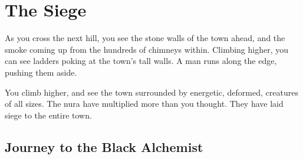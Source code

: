 \chapter{The Siege}

\begin{center}
\begin{tcolorbox}[width=35em]

	As you cross the next hill, you see the stone walls of the town ahead, and the smoke coming up from the hundreds of chimneys within.
	Climbing higher, you can see ladders poking at the town's tall walls.
	A man runs along the edge, pushing them aside.

	You climb higher, and see the town surrounded by energetic, deformed, creatures of all sizes.
	The nura have multiplied more than you thought.
	They have laid siege to the entire town.

\end{tcolorbox}
\end{center}

\section{Journey to the Black Alchemist}


